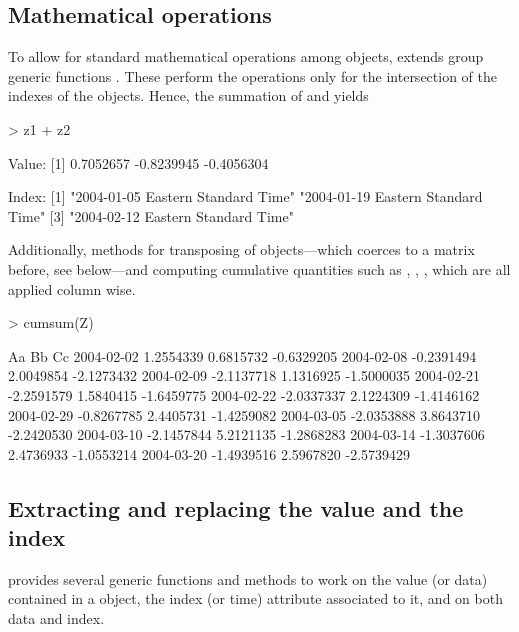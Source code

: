 \documentclass{Z}
\begin{document}
\subsection{Mathematical operations}
\label{sec:Ops}

To allow for standard mathematical operations among 
objects,  extends group generic functions .
These perform the operations only for the intersection of the
indexes of the objects. Hence, the summation of  and
 yields
\begin{Schunk}
\begin{Sinput}
> z1 + z2
\end{Sinput}
\begin{Soutput}
Value:
[1]  0.7052657 -0.8239945 -0.4056304

Index:
[1] "2004-01-05 Eastern Standard Time" "2004-01-19 Eastern Standard Time"
[3] "2004-02-12 Eastern Standard Time"
\end{Soutput}
\end{Schunk}

Additionally, methods for transposing  of 
objects---which coerces to a matrix before, see below---and 
computing cumulative quantities such as
, , , 
which are all applied column wise.
\begin{Schunk}
\begin{Sinput}
> cumsum(Z)
\end{Sinput}
\begin{Soutput}
           Aa         Bb         Cc        
2004-02-02  1.2554339  0.6815732 -0.6329205
2004-02-08 -0.2391494  2.0049854 -2.1273432
2004-02-09 -2.1137718  1.1316925 -1.5000035
2004-02-21 -2.2591579  1.5840415 -1.6459775
2004-02-22 -2.0337337  2.1224309 -1.4146162
2004-02-29 -0.8267785  2.4405731 -1.4259082
2004-03-05 -2.0353888  3.8643710 -2.2420530
2004-03-10 -2.1457844  5.2121135 -1.2868283
2004-03-14 -1.3037606  2.4736933 -1.0553214
2004-03-20 -1.4939516  2.5967820 -2.5739429
\end{Soutput}
\end{Schunk}


\subsection{Extracting and replacing the value and the index}
\label{sec:window}

 provides several generic functions and methods
to work on the value (or data) contained in a  object, the
index (or time) attribute associated to it, and on both data and
index.
\end{document}
